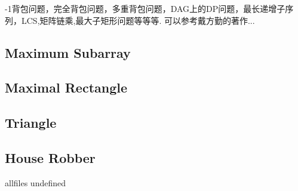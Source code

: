 \documentclass{article}
\begin{document}
\begin{CJK}{UTF8}{gbsn}     %

\else
    
-1背包问题，完全背包问题，多重背包问题，DAG上的DP问题，最长递增子序列，LCS,矩阵链乘,最大子矩形问题等等等. 可以参考戴方勤的著作...
\subsection{Maximum Subarray}

\subsection{Maximal Rectangle}

\subsection{Triangle}

\subsection{House Robber}


\fi

\ifx allfiles undefined
\end{CJK}
\end{document}
